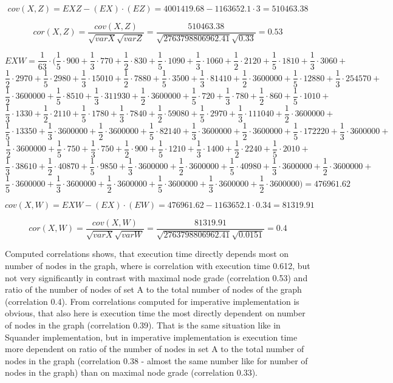 \documentclass[11pt,twoside,a4paper]{book}
\begin{document}
$$cov\left(X,Z\right)=EXZ-\left(EX\right)\cdot \left(EZ\right)=4001419.68
-1163652.1\cdot 3=510463.38$$

$$cor(X,Z)=\frac{cov(X,Z)}{\sqrt{varX}\sqrt{varZ}}=\frac{510463.38}{\sqrt{2763798806962.41}\sqrt{0.33}}=0.53$$


$$EXW= \frac{1}{63}\cdot(\frac{1}{5}\cdot 900  + \frac{1}{3}\cdot  770  +
\frac{1}{2}\cdot 830 + \frac{1}{5} \cdot  1090+ \frac{1}{3} \cdot   1060+
\frac{1}{2} \cdot  2120  +\frac{1}{5} \cdot   1810 +\frac{1}{3}\cdot 3060+$$
$$\frac{1}{2} \cdot  2970 +\frac{1}{5}\cdot 2980 +\frac{1}{3}\cdot  15010
+\frac{1}{2}\cdot 7880 +\frac{1}{5}\cdot  3500 +\frac{1}{3}\cdot   81410
+\frac{1}{2}\cdot 3600000+\frac{1}{5}\cdot 12880 +\frac{1}{3}\cdot  254570 +$$
$$\frac{1}{2}\cdot   3600000  +\frac{1}{5}\cdot  8510 +\frac{1}{3}\cdot   311930
+\frac{1}{2}\cdot 3600000 +\frac{1}{5}\cdot 720 +\frac{1}{3}\cdot 780
+\frac{1}{2}\cdot 860 + \frac{1}{5} \cdot 1010+$$ $$\frac{1}{3}\cdot   1330 
+\frac{1}{2}\cdot  2110 +\frac{1}{5}\cdot   1780 +\frac{1}{3}\cdot  7840
+\frac{1}{2}\cdot 59080 +\frac{1}{5}\cdot 2970 +\frac{1}{3}\cdot  111040
+\frac{1}{2} \cdot  3600000+$$ $$\frac{1}{5}\cdot  13350  +\frac{1}{3}\cdot
3600000 +\frac{1}{2}\cdot 3600000 +\frac{1}{5}\cdot  82140 +\frac{1}{3}\cdot
3600000 +\frac{1}{2}\cdot  3600000 +\frac{1}{5}\cdot  172220 + \frac{1}{3} \cdot
3600000+$$ $$\frac{1}{2}\cdot  3600000  +\frac{1}{5}\cdot 750
+\frac{1}{3}\cdot  750 +\frac{1}{2}\cdot  900 +\frac{1}{5}\cdot 1210
 +\frac{1}{3}\cdot 1400 +\frac{1}{2}\cdot   2240 + \frac{1}{5} \cdot  2010+$$
 $$\frac{1}{3}\cdot   38610  +\frac{1}{2}\cdot  40870
+\frac{1}{5}\cdot  9850 +\frac{1}{3}\cdot   3600000 +\frac{1}{2}\cdot  3600000
 +\frac{1}{5}\cdot 40980 +\frac{1}{3}\cdot   3600000 + \frac{1}{2} \cdot 
 3600000+$$ $$\frac{1}{5}\cdot  3600000  +\frac{1}{3}\cdot  3600000
+\frac{1}{2}\cdot 3600000  +\frac{1}{5}\cdot 3600000 +\frac{1}{3}\cdot  3600000
 +\frac{1}{2}\cdot   3600000)=476961.62$$
 
$$cov\left(X,W\right)=EXW-\left(EX\right)\cdot \left(EW\right)=476961.62
-1163652.1\cdot 0.34=81319.91$$

$$cor(X,W)=\frac{cov(X,W)}{\sqrt{varX}\sqrt{varW}}=\frac{81319.91}{\sqrt{2763798806962.41}\sqrt{0.0151}}=0.4$$

Computed correlations shows, that execution time directly depends most on
number of nodes in the graph, where is correlation with execution time 0.612,
but not very significantly in contrast with maximal node grade (correlation
0.53) and ratio of the number of nodes of set A to the total number of nodes of
the graph (correlation 0.4). From correlations computed for imperative
implementation is obvious, that also here is execution time the most directly
dependent on number of nodes in the graph (correlation 0.39). That is the
same situation like in Squander implementation, but in imperative implementation
is execution time more dependent on ratio of the number of nodes in set A to the
total number of nodes in the graph (correlation 0.38 - almost the same number
like for number of nodes in the graph) than on maximal node grade (correlation
0.33).
\end{document}

